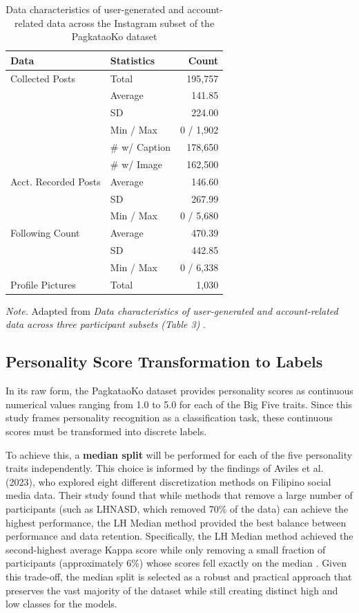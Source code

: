 \begin{table}[h!]
\centering
\caption{Data characteristics of user-generated and account-related data across the Instagram subset of the PagkataoKo dataset}
\label{tab:pagkataoko_data_characteristics}
\begin{tabular}{@{}llr@{}}
\toprule
\textbf{Data} & \textbf{Statistics} & \textbf{Count} \\ 
\midrule
    {Collected Posts} & Total & 195,757 \\
    & Average & 141.85 \\
    & SD & 224.00 \\
    & Min / Max & 0 / 1,902 \\
    & \# w/ Caption & 178,650 \\
    & \# w/ Image & 162,500 \\
\midrule
    {Acct. Recorded Posts} & Average & 146.60 \\
    & SD & 267.99 \\
    & Min / Max & 0 / 5,680 \\
\midrule
    {Following Count} & Average & 470.39 \\
    & SD & 442.85 \\
    & Min / Max & 0 / 6,338 \\
\midrule
Profile Pictures & Total & 1,030 \\
\bottomrule
\end{tabular}
\begin{minipage}{\linewidth}
\small\textit{Note.} Adapted from \textit{Data characteristics of user-generated and account-related data across three participant subsets (Table 3)} \citep{tighe_acorda_2022}.
\end{minipage}
\end{table}


\subsection{Personality Score Transformation to Labels}
In its raw form, the PagkataoKo dataset provides personality scores as continuous numerical values ranging from 1.0 to 5.0 for each of the Big Five traits. Since this study frames personality recognition as a classification task, these continuous scores must be transformed into discrete labels.

To achieve this, a \textbf{median split} will be performed for each of the five personality traits independently. This choice is informed by the findings of Aviles et al. (2023), who explored eight different discretization methods on Filipino social media data. Their study found that while methods that remove a large number of participants (such as LHNASD, which removed 70\% of the data) can achieve the highest performance, the LH Median method provided the best balance between performance and data retention. Specifically, the LH Median method achieved the second-highest average Kappa score while only removing a small fraction of participants (approximately 6\%) whose scores fell exactly on the median \citep{aviles2023}. Given this trade-off, the median split is selected as a robust and practical approach that preserves the vast majority of the dataset while still creating distinct high and low classes for the models.

